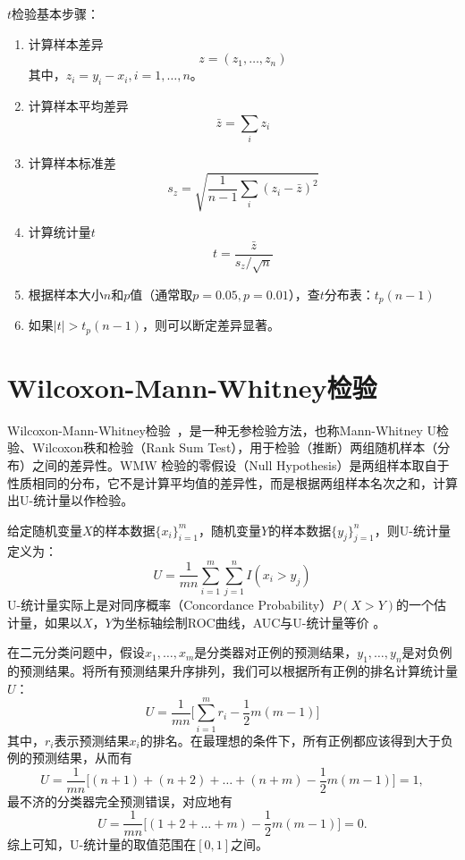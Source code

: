 $t$检验基本步骤：
\begin{enumerate}
  \item 计算样本差异
  \[
    z = (z_1,\ldots,z_n)
  \]
  其中，$z_i = y_i - x_i,i=1,\ldots,n$。
  \item 计算样本平均差异
  \[
    \bar{z} = \sum\limits_i z_i
  \]
  \item 计算样本标准差
  \[
    s_z = \sqrt{\frac{1}{n-1}\sum\limits_i (z_i - \bar{z})^2}
  \]
  \item 计算统计量$t$
  \[
    t = \frac{\bar{z}}{s_z/\sqrt{n}}
  \]
  \item 根据样本大小$n$和$p$值（通常取$p=0.05,p=0.01$），查$t$分布表：$t_p(n-1)$
  \item 如果$|t|>t_p(n-1)$，则可以断定差异显著。
\end{enumerate}

\section{Wilcoxon-Mann-Whitney检验}
Wilcoxon-Mann-Whitney检验~\cite{wilcoxon1945individual,mann1947test}，是一种无参检验方法，也称Mann-Whitney U检验、Wilcoxon秩和检验（Rank Sum Test），用于检验（推断）两组随机样本（分布）之间的差异性。WMW 检验的零假设（Null Hypothesis）是两组样本取自于性质相同的分布，它不是计算平均值的差异性，而是根据两组样本名次之和，计算出U-统计量以作检验。

给定随机变量$X$的样本数据$\{x_i\}_{i=1}^m$，随机变量$Y$的样本数据$\{y_j\}_{j=1}^n$，则U-统计量定义为：
\begin{equation}
    U = \frac{1}{mn} \sum\limits_{i=1}^m \sum\limits_{j=1}^n I(x_i > y_j)
\end{equation}
U-统计量实际上是对同序概率（Concordance Probability）$P(X>Y)$的一个估计量，如果以$X$，$Y$为坐标轴绘制ROC曲线，AUC与U-统计量等价
\cite{hanely1982meaning}。

在二元分类问题中，假设$x_1,\ldots,x_m$是分类器对正例的预测结果，$y_1,\ldots,y_n$是对负例的预测结果。将所有预测结果升序排列，我们可以根据所有正例的排名计算统计量$U$：
\begin{equation}
    U = \frac{1}{mn} \big[\sum\limits_{i=1}^m r_i - \frac{1}{2} m(m-1) \big]
\end{equation}
其中，$r_i$表示预测结果$x_i$的排名。在最理想的条件下，所有正例都应该得到大于负例的预测结果，从而有
\begin{equation}
    U = \frac{1}{mn}\big[(n+1) + (n+2) + \ldots + (n+m) - \frac{1}{2} m(m-1)\big] = 1,
\end{equation}
最不济的分类器完全预测错误，对应地有
\begin{equation}
    U = \frac{1}{mn}\big[(1 + 2 + \ldots + m)  - \frac{1}{2} m(m-1)\big] = 0.
\end{equation}
综上可知，U-统计量的取值范围在$[0,1]$之间。

